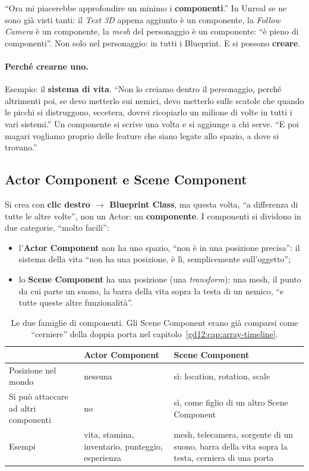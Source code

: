 ``Ora mi piacerebbe approfondire un minimo i \textbf{componenti}.'' In Unreal se
ne sono già visti tanti: il \emph{Text 3D} appena aggiunto è un componente,
la \emph{Follow Camera} è un componente, la \emph{mesh} del personaggio è un
componente: ``è pieno di componenti''. Non solo nel personaggio: in tutti i
Blueprint. E si possono \textbf{creare}.

\paragraph{Perché crearne uno.} Esempio: il \textbf{sistema di vita}. ``Non lo
creiamo dentro il personaggio, perché altrimenti poi, se devo metterlo sui
nemici, devo metterlo sulle scatole che quando le picchi si distruggono, eccetera,
dovrei ricopiarlo un milione di volte in tutti i vari sistemi.'' Un componente
si scrive una volta e si aggiunge a chi serve. ``E poi magari vogliamo proprio
delle feature che siano legate allo spazio, a dove si trovano.''

\subsection{Actor Component e Scene Component}

Si crea con \textbf{clic destro $\rightarrow$ Blueprint Class}, ma questa volta,
``a differenza di tutte le altre volte'', non un Actor: un
\textbf{componente}. I componenti si dividono in due categorie, ``molto
facili'':
\begin{itemize}
  \item l'\textbf{Actor Component} non ha uno spazio, ``non è in una posizione
        precisa'': il sistema della vita ``non ha una posizione, è lì,
        semplicemente sull'oggetto'';
  \item lo \textbf{Scene Component} ha una posizione (una \emph{transform}):
        una mesh, il punto da cui parte un suono, la barra della vita sopra la
        testa di un nemico, ``e tutte queste altre funzionalità''.
\end{itemize}

\begin{table}[htbp]
\centering
\small
\begin{tabular}{p{2.8cm}p{5cm}p{5.2cm}}
\toprule
 & \textbf{Actor Component} & \textbf{Scene Component}\\
\midrule
Posizione nel mondo & nessuna & sì: location, rotation, scale\\
Si può attaccare ad altri componenti & no & sì, come figlio di un altro
Scene Component\\
Esempi & vita, stamina, inventario, punteggio, esperienza & mesh, telecamera,
sorgente di un suono, barra della vita sopra la testa, cerniera di una porta\\
\bottomrule
\end{tabular}
\caption{Le due famiglie di componenti. Gli Scene Component erano già comparsi
come ``cerniere'' della doppia porta nel capitolo~\ref{gd12:cap:array-timeline}.}
\label{gd13:tab:componenti}
\end{table}

